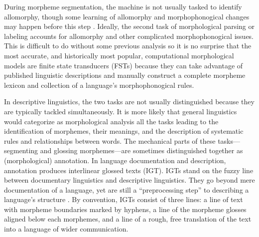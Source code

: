 \documentclass[12pt]{article}
\begin{document}
 During morpheme segmentation, the machine is not usually tasked to identify allomorphy, though some learning of allomorphy and morphophonogical changes may happen before this step \cite{goldsmith_computational_2017}. Ideally, the second task of morphological parsing or labeling accounts for allomorphy and other complicated morphophonogical issues. This is difficult to do without some previous analysis so it is no surprise that the most accurate, and historically most popular, computational morphological models are finite state transducers (FSTs) because they can take advantage of published linguistic descriptions and manually construct a complete morpheme lexicon and collection of a language's morphophonogical rules. 

In descriptive linguistics, the two tasks are not usually distinguished because they are typically tackled simultaneously. It is more likely that general linguistics would categorize as morphological analysis all the tasks leading to the identification of morphemes, their meanings, and the description of systematic rules and relationships between words. The mechanical parts of these tasks---segmenting and glossing morphemes---are sometimes distinguished together as (morphological) annotation. In language documentation and description, annotation produces interlinear glossed texts (IGT). IGTs stand on the fuzzy line between documentary linguistics and descriptive linguistics. They go beyond mere documentation of a language, yet are still a ``preprocessing step'' to describing a language's structure \cite{moon_unsupervised_2009}. By convention, IGTs consist of three lines: a line of text with morpheme boundaries marked by hyphens, a line of the morpheme glosses aligned below each morphemes, and a line of a rough, free translation of the text into a language of wider communication. 
\end{document}
